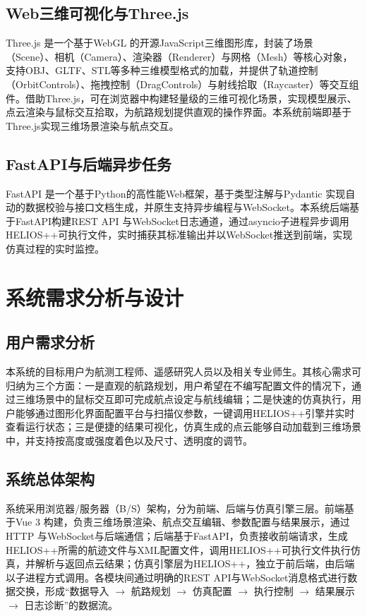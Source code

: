 \documentclass[a4paper,fleqn]{cas-sc}
\begin{document}
\subsection{Web三维可视化与Three.js}
Three.js \citep{threejs}是一个基于WebGL \citep{webgl} 的开源JavaScript三维图形库，封装了场景（Scene）、相机（Camera）、渲染器（Renderer）与网格（Mesh）等核心对象，支持OBJ、GLTF、STL等多种三维模型格式的加载，并提供了轨道控制（OrbitControls）、拖拽控制（DragControls）与射线拾取（Raycaster）等交互组件。借助Three.js，可在浏览器中构建轻量级的三维可视化场景，实现模型展示、点云渲染与鼠标交互拾取，为航路规划提供直观的操作界面。本系统前端即基于Three.js实现三维场景渲染与航点交互。

\subsection{FastAPI与后端异步任务}
FastAPI \citep{fastapi}是一个基于Python的高性能Web框架，基于类型注解与Pydantic \citep{pydantic} 实现自动的数据校验与接口文档生成，并原生支持异步编程与WebSocket。本系统后端基于FastAPI构建REST API \citep{fielding2000rest} 与WebSocket日志通道，通过asyncio子进程异步调用HELIOS++可执行文件，实时捕获其标准输出并以WebSocket推送到前端，实现仿真过程的实时监控。

\section{系统需求分析与设计}\label{sec:design}
\subsection{用户需求分析}
本系统的目标用户为航测工程师、遥感研究人员以及相关专业师生。其核心需求可归纳为三个方面：一是直观的航路规划，用户希望在不编写配置文件的情况下，通过三维场景中的鼠标交互即可完成航点设定与航线编辑；二是快速的仿真执行，用户能够通过图形化界面配置平台与扫描仪参数，一键调用HELIOS++引擎并实时查看运行状态；三是便捷的结果可视化，仿真生成的点云能够自动加载到三维场景中，并支持按高度或强度着色以及尺寸、透明度的调节。

\subsection{系统总体架构}
系统采用浏览器/服务器（B/S）架构，分为前端、后端与仿真引擎三层。前端基于Vue 3 \citep{vuejs} 构建，负责三维场景渲染、航点交互编辑、参数配置与结果展示，通过HTTP \citep{rfc9110,rfc9113,rfc9114} 与WebSocket与后端通信；后端基于FastAPI，负责接收前端请求，生成HELIOS++所需的航迹文件与XML配置文件，调用HELIOS++可执行文件执行仿真，并解析与返回点云结果；仿真引擎层为HELIOS++，独立于前后端，由后端以子进程方式调用。各模块间通过明确的REST API与WebSocket消息格式进行数据交换，形成“数据导入 $\rightarrow$ 航路规划 $\rightarrow$ 仿真配置 $\rightarrow$ 执行控制 $\rightarrow$ 结果展示 $\rightarrow$ 日志诊断”的数据流。
\end{document}
